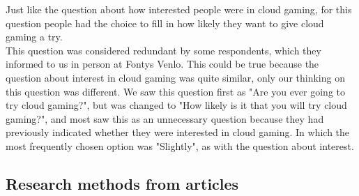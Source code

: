 Just like the question about how interested people were in cloud gaming, for this question people had the choice to fill in how likely they want to give cloud gaming a try.\\
This question was considered redundant by some respondents, which they informed to us in person at Fontys Venlo. This could be true because the question about interest in cloud gaming was quite similar, only our thinking on this question was different. We saw this question first as "Are you ever going to try cloud gaming?", but was changed to "How likely is it that you will try cloud gaming?", and most saw this as an unnecessary question because they had previously indicated whether they were interested in cloud gaming. In which the most frequently chosen option was "Slightly", as with the question about interest.
\\
\subsection{Research methods from articles}

